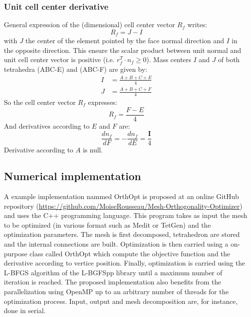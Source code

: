 \documentclass[11pt]{article}
\begin{document}
\subsubsection{Unit cell center derivative}

General expression of the (dimensional) cell center vector $R_f$ writes:
%
\begin{equation}
R_f = J-I
\end{equation}
%
with $J$ the center of the element pointed by the face normal direction and $I$ in the opposite direction.
This ensure the scalar product between unit normal and unit cell center vector is positive (i.e. $r_f^T \cdot n_f \geq 0$).
Mass centers $I$ and $J$ of both tetrahedra (ABC-E) and (ABC-F) are given by:
%
\begin{subequations}
  \begin{align}
  I &= \frac{A+B+C+E}{4} \\
  J &= \frac{A+B+C+F}{4}
  \end{align}
\end{subequations}
%
So the cell center vector $R_f$ expresses:
%
\begin{equation}
R_f = \frac{F-E}4
\end{equation}
%
And derivatives according to $E$ and $F$ are:
%
\begin{equation}
\frac{d n_f}{dF} = - \frac{d n_f}{dE} = \frac{\boldsymbol{I}}4
\end{equation}
%
Derivative according to $A$ is null.


\subsection{Numerical implementation}

A example implementation nammed OrthOpt is proposed at an online GitHub repository (\href{https://github.com/MoiseRousseau/Mesh-Orthogonality-Optimizer}{https://github.com/MoiseRousseau/Mesh-Orthogonality-Optimizer}) and uses the C++ programming language. 
This program takes as input the mesh to be optimized (in various format such as Medit or TetGen) and the optimization parameters. 
The mesh is first decomposed, tetrahedron are stored and the internal connections are built. 
Optimization is then carried using a on-purpose class called OrthOpt which compute the objective function and the derivative according to vertice position. 
Finally, optimization is carried using the L-BFGS algorithm of the L-BGFSpp library \cite{} until a maximum number of iteration is reached.
The proposed implementation also benefits from the parallelization using OpenMP up to an arbitrary number of threads for the optimization process.
Input, output and mesh decomposition are, for instance, done in serial.
\end{document}
